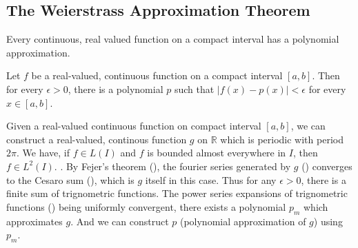 \subsection{The Weierstrass Approximation Theorem}
\begin{important}
Every continuous, real valued function on a compact interval has a polynomial approximation.
	\cite[Theorem 11.17]{apostol}
\end{important}
\begin{theorem}[Weierstrass]
Let $f$ be a real-valued, continuous function on a compact interval $[a,b]$.
Then for every \(\epsilon > 0\), there is a polynomial $p$ such that \(|f(x)-p(x)| < \epsilon\) for every \(x \in [a,b]\).
\end{theorem}
\begin{synopsis}
Given a real-valued continuous function on compact interval $[a,b]$, we can construct a real-valued, continous function $g$ on $\mathbb{R}$ which is periodic with period $2\pi$.
We have, if \(f \in L(I)\) and $f$ is bounded almost everywhere in $I$, then \(f \in L^2(I)\).
	\cite[Theorem 10.52]{apostol}.
By Fejer's theorem (\cite[Theorem 11.15]{apostol}), the fourier series generated by $g$ (\cite[definition 11.3]{apostol}) converges to the Cesaro sum (\cite[Definition 8.47]{apostol}), which is $g$ itself in this case.
Thus for any \(\epsilon > 0\), there is a finite sum of trignometric functions.
The power series expansions of trignometric functions (\cite[definition 9.27]{apostol}) being uniformly convergent, there exists a polynomial $p_m$ which approximates $g$.
And we can construct $p$ (polynomial approximation of $g$) using $p_m$.
\end{synopsis}
